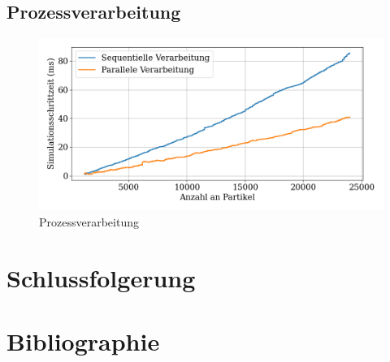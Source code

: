 \documentclass[a4paper, 12pt]{article}
\begin{document}
\subsection{Prozessverarbeitung}
\begin{figure}[H]
	\centering
	\includegraphics[width=\textwidth]{graphics/Prozessverarbeitung.png}
	\caption{Prozessverarbeitung}
\end{figure}

\section{Schlussfolgerung}

\section{Bibliographie}
\end{document}
